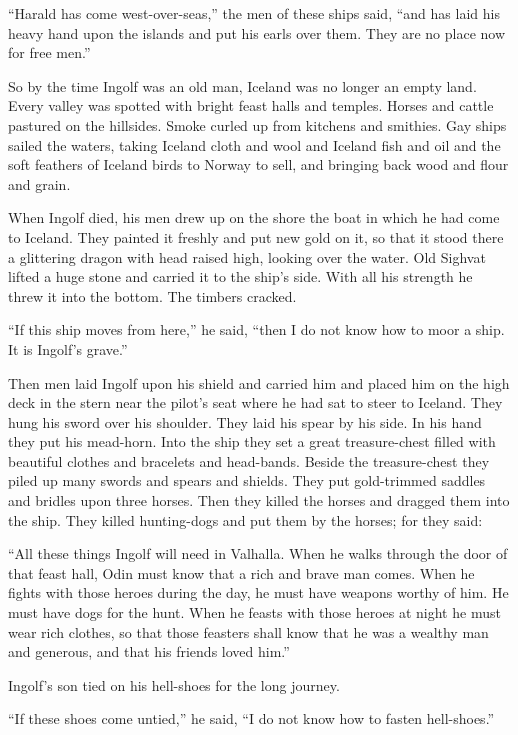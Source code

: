``Harald has come west-over-seas,'' the men of these ships said, ``and
has laid his heavy hand upon the islands and put his earls over them.
They are no place now for free men.''

So by the time Ingolf was an old man, Iceland was no longer an empty
land. Every valley was spotted with bright feast halls and temples.
Horses and cattle pastured on the hillsides. Smoke curled up from
kitchens and smithies. Gay ships sailed the waters, taking Iceland cloth
and wool and Iceland fish and oil and the soft feathers of Iceland birds
to Norway to sell, and bringing back wood and flour and grain.

When Ingolf died, his men drew up on the shore the boat in which he had
come to Iceland. They painted it freshly and put new gold on it, so that
it stood there a glittering dragon with head raised high, looking over
the water. Old Sighvat lifted a huge stone and carried it to the ship's
side. With all his strength he threw it into the bottom. The timbers
cracked.

``If this ship moves from here,'' he said, ``then I do not know how to
moor a ship. It is Ingolf's grave.''

Then men laid Ingolf upon his shield and carried him and placed him on
the high deck in the stern near the pilot's seat where he had sat to
steer to Iceland. They hung his sword over his shoulder. They laid his
spear by his side. In his hand they put his mead-horn. Into the ship
they set a great treasure-chest filled with beautiful clothes and
bracelets and head-bands. Beside the treasure-chest they piled up many
swords and spears and shields. They put gold-trimmed saddles and bridles
upon three horses. Then they killed the horses and dragged them into the
ship. They killed hunting-dogs and put them by the horses; for they
said:

``All these things Ingolf will need in Valhalla. When he walks through
the door of that feast hall, Odin must know that a rich and brave man
comes. When he fights with those heroes during the day, he must have
weapons worthy of him. He must have dogs for the hunt. When he feasts
with those heroes at night he must wear rich clothes, so that those
feasters shall know that he was a wealthy man and generous, and that his
friends loved him.''

Ingolf's son tied on his hell-shoes for the long journey.

``If these shoes come untied,'' he said, ``I do not know how to fasten
hell-shoes.''

